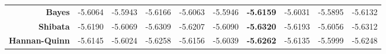 \begin{landscape}
\begin{table}[]
\begin{tabular}{r|l|l|l|l|l|l|lll}
\textbf{Bayes} & -5.6064 & -5.5943 & -5.6166 & -5.6063 & -5.5946 & \textbf{-5.6159} & \multicolumn{1}{l|}{-5.6031} & \multicolumn{1}{l|}{-5.5895} & -5.6132 \\
\textbf{Shibata} & -5.6190 & -5.6069 & -5.6309 & -5.6207 & -5.6090 & \textbf{-5.6320} & \multicolumn{1}{l|}{-5.6193} & \multicolumn{1}{l|}{-5.6056} & -5.6312 \\
\textbf{Hannan-Quinn} & -5.6145 & -5.6024 & -5.6258 & -5.6156 & -5.6039 & \textbf{-5.6262} & \multicolumn{1}{l|}{-5.6135} & \multicolumn{1}{l|}{-5.5999} & -5.6248 \\ \hline
\end{tabular}
\end{table}
\end{landscape}
